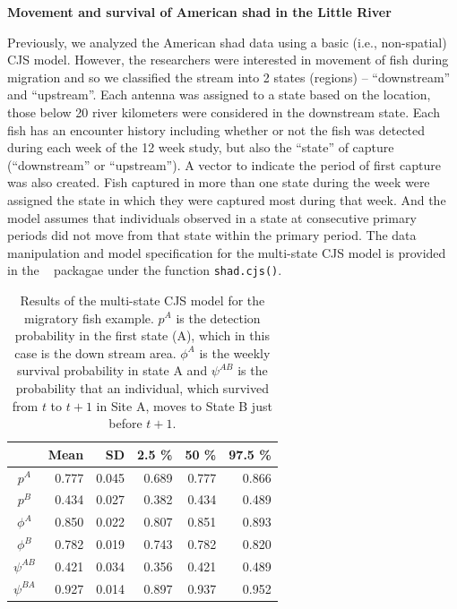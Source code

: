 {\flushleft \bf Movement and survival of American shad in the Little River}

Previously, we analyzed the American shad data using a basic (i.e., non-spatial) CJS
model.  However, the researchers were interested in movement of fish
during migration and so we classified the stream into 2 states
(regions) -- ``downstream'' and ``upstream''.  Each antenna was assigned
to a state based on the location, those below 20 river kilometers were
considered in the downstream state.  Each fish has an encounter
history including whether or not the fish was detected during each
week of the 12 week study, but also the ``state'' of capture
(``downstream'' or ``upstream'').  A vector to indicate the
period of first capture was also created.  Fish captured in more than
one state during the week were assigned the state in which they were
captured most during that week.  And the model assumes that individuals 
observed in a state at consecutive primary periods did not move from that state
within the primary period.  The data manipulation and model specification for the 
multi-state CJS model is provided in the \scrbook~ packagae under the function \verb+shad.cjs()+.

\begin{table}
\centering
\caption{
  Results of the multi-state CJS model for the migratory fish example.  $p^A$ is the detection probability in the first state (A), which in this case is the down stream area.  $\phi^A$ is the weekly survival probability in state A and $\psi^{AB}$ is the probability that an individual, which survived from $t$ to $t+1$ in Site A, moves to State B just
  before $t+1$.
}
\begin{tabular}{crrrrr}
\hline \hline
&       Mean   &  SD  &  2.5 \%   &   50 \%    &  97.5 \%  \\  \hline
$p^A$ & 0.777 & 0.045 & 0.689  & 0.777  & 0.866 \\
$p^B$  & 0.434  & 0.027 & 0.382 & 0.434  & 0.489 \\
$\phi^A$  & 0.850 & 0.022 & 0.807  & 0.851  & 0.893  \\
$\phi^B$  & 0.782  & 0.019 & 0.743  & 0.782& 0.820  \\
$\psi^{AB}$ & 0.421 & 0.034 & 0.356  & 0.421 &  0.489 \\
$\psi^{BA}$& 0.927 & 0.014 & 0.897  & 0.937 &  0.952  \\
\hline
\end{tabular}
\label{open.tab.multi-shad}
\end{table}

